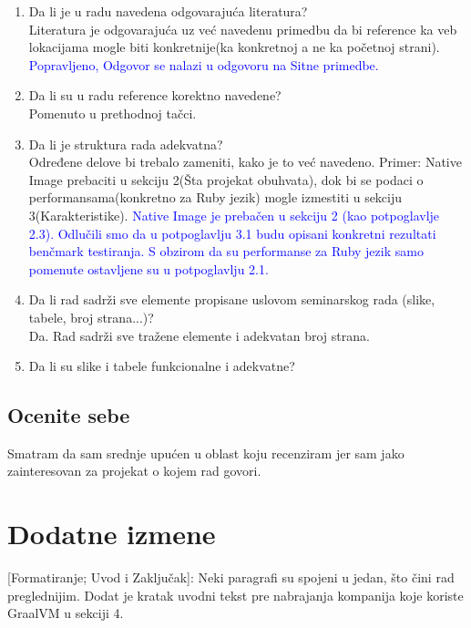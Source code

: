 \documentclass[a4paper]{report}
\newcommand{\odgovor}[1]{\textcolor{blue}{#1}}
\begin{document}
\begin{enumerate}
\item Da li je u radu navedena odgovarajuća literatura?\\
Literatura je odgovarajuća uz već navedenu primedbu da bi reference ka veb lokacijama mogle biti konkretnije(ka konkretnoj a ne ka početnoj 
strani). \odgovor{Popravljeno, Odgovor se nalazi u odgovoru na Sitne primedbe.}

\item Da li su u radu reference korektno navedene?\\
Pomenuto u prethodnoj tačci.

\item Da li je struktura rada adekvatna?\\
Određene delove bi trebalo zameniti, kako je to već navedeno. Primer: Native Image prebaciti u sekciju 2(Šta projekat obuhvata), dok bi se 
podaci o performansama(konkretno za Ruby jezik) mogle izmestiti u sekciju 3(Karakteristike). \odgovor{Native Image je prebačen u sekciju 2 (kao potpoglavlje 2.3). Odlučili smo da u potpoglavlju 3.1 budu opisani konkretni rezultati benčmark testiranja. S obzirom da su performanse za Ruby jezik samo pomenute ostavljene su u potpoglavlju 2.1.}

\item Da li rad sadrži sve elemente propisane uslovom seminarskog rada (slike, tabele, broj strana...)?\\
Da. Rad sadrži sve tražene elemente i adekvatan broj strana. 

\item Da li su slike i tabele funkcionalne i adekvatne?\\


\end{enumerate}

\section{Ocenite sebe}
Smatram da sam srednje upućen u oblast koju recenziram jer sam jako zainteresovan za projekat o kojem rad govori.



\chapter{Dodatne izmene}
[Formatiranje; Uvod i Zaključak]: Neki paragrafi su spojeni u jedan, što čini rad preglednijim.
Dodat je kratak uvodni tekst pre nabrajanja kompanija koje koriste GraalVM u sekciji 4.
\end{document}
